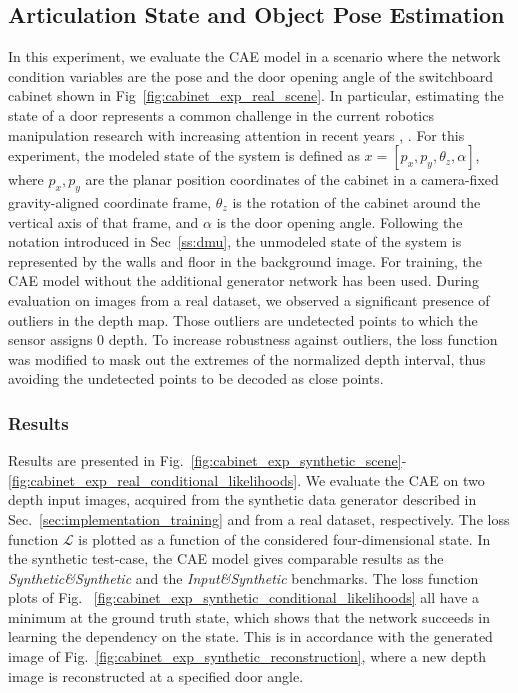 \documentclass[letterpaper, 10 pt, journal, twoside]{ieeetran}  %
\begin{document}
\subsection{Articulation State and Object Pose Estimation}
\label{subsec:articulated_object_measurement_update}
In this experiment, we evaluate the CAE model in a scenario where the network condition variables are the pose and the door opening angle of the switchboard cabinet shown in Fig~\ref{fig:cabinet_exp_real_scene}. 
In particular, estimating the state of a door represents a common challenge in the current robotics manipulation research with increasing attention in recent years \cite{arduengo2019robust}, \cite{mittal2021articulated}.
For this experiment, the modeled state of the system is defined as $x = [p_x, p_y, \theta_z, \alpha]$, where $p_x, p_y$ are the planar position coordinates of the cabinet in a camera-fixed gravity-aligned coordinate frame, $\theta_z$ is the rotation of the cabinet around the vertical axis of that frame, and $\alpha$ is the door opening angle. Following the notation introduced in Sec~\ref{ss:dmu}, the unmodeled state of the system is represented by the walls and floor in the background image.
For training, the CAE model without the additional generator network has been used. During evaluation on images from a real dataset, we observed a significant presence of outliers in the depth map. Those outliers are undetected points to which the sensor assigns $0$ depth. To increase robustness against outliers, the loss function was modified to mask out the extremes of the normalized depth interval, thus avoiding the undetected points to be decoded as close points.
\subsubsection*{Results}
Results are presented in Fig.~\ref{fig:cabinet_exp_synthetic_scene}-\ref{fig:cabinet_exp_real_conditional_likelihoods}. We evaluate the CAE on two depth input images, acquired from the synthetic data generator described in Sec.~\ref{sec:implementation_training} and from a real dataset, respectively. The loss function $\mathcal{L}$ is plotted as a function of the considered four-dimensional state. In the synthetic test-case, the CAE model gives comparable results as the \textit{Synthetic\&Synthetic} and the \textit{Input\&Synthetic} benchmarks. The loss function plots of Fig. ~\ref{fig:cabinet_exp_synthetic_conditional_likelihoods} all have a minimum at the ground truth state, which shows that the network succeeds in learning the dependency on the state. This is in accordance with the generated image of  Fig.~\ref{fig:cabinet_exp_synthetic_reconstruction}, where a new depth image is reconstructed at a specified door angle.
\end{document}
